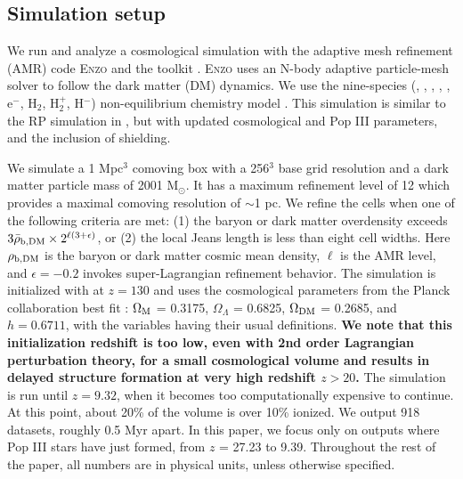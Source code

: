 \documentclass[fleqn,usenatbib]{mnras}
\begin{document}
\subsection{Simulation setup}
We run and analyze a cosmological simulation with the adaptive mesh refinement (AMR) code \textsc{Enzo} \citep{Enzo} and the toolkit \yt{} \citep{yt_full_paper}. \textsc{Enzo} uses an N-body adaptive particle-mesh solver \citep{Efstathiou85, Couchman91} to follow the dark matter (DM) dynamics. We use the nine-species (\hi, \hii, \hei, \heii, \heiii, e$^{-}$, H$_{2}$, H$_{2}^{+}$, H$^{-}$) non-equilibrium chemistry model \citep{Abel97, Anninos97}. This simulation is similar to the RP simulation in \citet[hereafter W12]{Wise12_RP}, but with updated cosmological and Pop III parameters, and the inclusion of \hh{} shielding.

We simulate a 1 Mpc$^{3}$ comoving box with a 256$^{3}$ base grid 
resolution and a dark matter particle mass of 2001 M$_{\odot}$. It has a maximum refinement level of 12 which provides a maximal comoving resolution of $\sim$1 pc.  We refine the cells when one of the following criteria are met: (1) the baryon or dark matter overdensity exceeds $3\bar{\rho}_{\rm b,DM} \times 2^{\ell(3+\epsilon)}$, or (2) the local Jeans length is less than eight cell widths.  Here $\rho_{\rm b,DM}$ is the baryon or dark matter cosmic mean density, $\ell$ is the AMR level, and $\epsilon = -0.2$ invokes super-Lagrangian refinement behavior. The simulation is initialized with \music{} \citep{Hahn11_MUSIC} at $z = 130$ and uses the cosmological parameters from the Planck collaboration best fit \citet{Planck13_Cosmo}: $\Omega_{\rm M}$ = 0.3175, $\Omega_{\Lambda}$ = 0.6825, $\Omega_{\rm DM}$ = 0.2685, and $h = 0.6711$, with the variables having their usual definitions. \textbf{We note that this initialization redshift is too low, even with 2nd order Lagrangian perturbation theory, for a small cosmological volume and results in delayed structure formation at very high redshift $z > 20$.} The simulation is run until $z = 9.32$, when it becomes too computationally expensive to continue. At this point, about 20\% of the volume is over 10\% ionized. We output 918 datasets,  roughly 0.5 Myr apart. In this paper, we focus only on outputs where Pop III stars have just formed, from $z$ = 27.23 to 9.39. Throughout the rest of the paper, all numbers are in physical units, unless otherwise specified.
\end{document}
